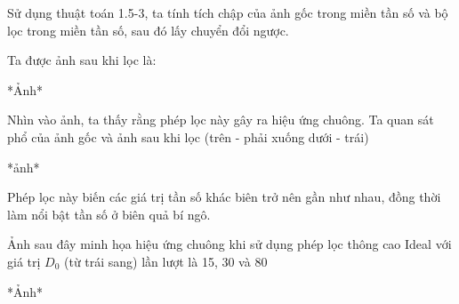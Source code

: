 \documentclass[12pt,a4paper]{report}
\numberwithin{equation}{section}
\theoremstyle{definition} %
\begin{document}
Sử dụng thuật toán 1.5-3, ta tính tích chập của ảnh gốc trong miền tần số và bộ lọc trong miền tần số, sau đó lấy chuyển đổi ngược.

Ta được ảnh sau khi lọc là:

*Ảnh*

Nhìn vào ảnh, ta thấy rằng phép lọc này gây ra hiệu ứng chuông. Ta quan sát phổ của ảnh gốc và ảnh sau khi lọc (trên - phải xuống dưới - trái)

*ảnh*

Phép lọc này biến các giá trị tần số khác biên trở nên gần như nhau, đồng thời làm nổi bật tần số ở biên quả bí ngô.

Ảnh sau đây minh họa hiệu ứng chuông khi sử dụng phép lọc thông cao Ideal với giá trị $D_0$ (từ trái sang) lần lượt là 15, 30 và 80

*Ảnh*
\end{document}
